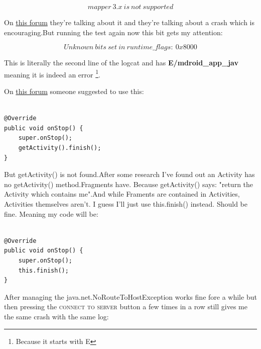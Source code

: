 \documentclass[a4paper,12pt]{book}
\begin{document}
\[mapper \ 3.x \ is \ not \ supported\]

On \href{https://github.com/flutter/flutter/issues/50405}{this forum} they're talking about it and they're talking about a crash which is encouraging.But running the test again now this bit gets my attention:

\[Unknown \ bits \ set \ in \ runtime\_flags: \ 0x8000\]

This is literally the second line of the logcat and has \textbf{E/mdroid\_app\_jav} meaning it is indeed an error \footnote{\label{error} Because it starts with E}.

On \href{https://stackoverflow.com/questions/56916587/unknown-bits-set-in-runtime-flags-0x8000-warning-in-logcat-on-android-q-emula}{this forum} someone suggested to use this:

\begin{lstlisting}

@Override
public void onStop() {
    super.onStop();
    getActivity().finish();
}

\end{lstlisting}

But getActivity() is not found.After some research I've found out an Activity has no getActivity() method.Fragments have. Because getActivity() says: "return the Activity which contains me".And while Framents are contained in Activities, Activities themselves aren't. I guess I'll just use this.finish() instead. Should be fine. Meaning my code will be:

\begin{lstlisting}

@Override
public void onStop() {
    super.onStop();
    this.finish();
}

\end{lstlisting}

After managing the java.net.NoRouteToHostException works fine fore a while but then pressing the \textsc{connect to server} button a few times in a row still gives me the same crash with the same log:
\end{document}
